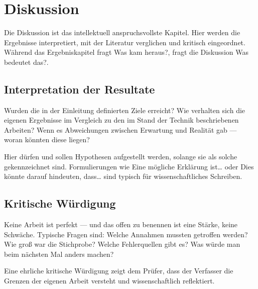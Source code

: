 \chapter{Diskussion}

Die Diskussion ist das intellektuell anspruchsvollste Kapitel. Hier werden die Ergebnisse interpretiert, mit der Literatur verglichen und kritisch eingeordnet. Während das Ergebniskapitel fragt \glqq Was kam heraus?\grqq, fragt die Diskussion \glqq Was bedeutet das?\grqq.

\section{Interpretation der Resultate}

Wurden die in der Einleitung definierten Ziele erreicht? Wie verhalten sich die eigenen Ergebnisse im Vergleich zu den im Stand der Technik beschriebenen Arbeiten? Wenn es Abweichungen zwischen Erwartung und Realität gab — woran könnten diese liegen?

Hier dürfen und sollen Hypothesen aufgestellt werden, solange sie als solche gekennzeichnet sind. Formulierungen wie \glqq Eine mögliche Erklärung ist\ldots\grqq{} oder \glqq Dies könnte darauf hindeuten, dass\ldots\grqq{} sind typisch für wissenschaftliches Schreiben.

\section{Kritische Würdigung}

Keine Arbeit ist perfekt — und das offen zu benennen ist eine Stärke, keine Schwäche. Typische Fragen sind: Welche Annahmen mussten getroffen werden? Wie groß war die Stichprobe? Welche Fehlerquellen gibt es? Was würde man beim nächsten Mal anders machen?

Eine ehrliche kritische Würdigung zeigt dem Prüfer, dass der Verfasser die Grenzen der eigenen Arbeit versteht und wissenschaftlich reflektiert.